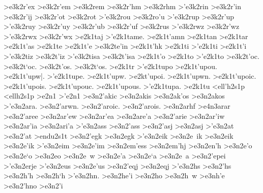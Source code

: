 {	>e3k2r'ex 
	>e3k2r'em		%
	>e3k2rem
	>e3k2r'hm		%
	>e3k2rhm
	>'e3k2rin		%
	>e3k2r'in
	>e3k2r'ij
	>e3k2r'ot		%
	>e3k2rot
	>'e3k2rou		%
	>e3k2ro'u
	>'e3k2rup  		%
	>e3k2r'up 		%
	>'e3k2ruy
	>e3k2r'uy
	>e3k2r'ub
	>e3k2r'uf
	>e3k2rus  		%
	>'e3k2rwz  		%
	>e3k2r'wz
	>'e3k2rwx  		%
	>e3k2r'wx
>e2k1taj  		%
>'e2k1tame. 		%
>e2k1t'amn  		%
>e2k1tan    		%
>e2k1tar   		%
>e2k1t'as   		%
>e2k1te
>e2k1t'e
	>e3k2te'in		%
>e2k1t'hk   		%
>e2k1ti
>'e2k1ti
>e2k1t'i
	>'e3k2tiz		%
	>e3k2t'iz
	>'e3k2tisa		%
	>e3k2t'isa
>e2k1t'o
>e2k1to
>'e2k1to
	>e3k2t'oc.		%
	>e3k2t`oc.
	>e3k2t'os.
	>e3k2t`os.
>e2k1tr
>'e2k1tupo  		%
>e2k1t'upou.
>e2k1t'upw|.
>'e2k1tupe.
>e2k1t'upw.
>e2kt'upoi.
>e2k1t'upwn.
>e2k1t'upoic.
>e2k1t'upois.
>e2k1t'upouc.
>e2k1t'upous.
>'e2k1tupa.
>e2k1tu
<ell'h2s1p 		%
<ellh2s1p
>e2n1
>'e2n1
	>e3n2'akic 		%
	>e3n2akis  		%
	>e3n2ak'os 		%
	>e3n2akos
	>'e3n2ara.   		%
	>e3n2'arwn.
	>e3n2'aroic.
	>e3n2'arois.
	>e3n2arhf   		%
		>e4n3arar 		%
	>e3n2'aree  		%
	>e3n2ar'ew
	>e3n2ar'ea  		%
	>e3n2are'a
	>e3n2'arie  		%
	>e3n2ar'iw
	>e3n2ar'ia  		%
	>e3n2ari'a
	>'e3n2ass  		%
	>e3n2'ass
	>e3n2'asj
	>e3n2asj
	>'e3n2at   		%
	>e3n2'at
>endu2s1t   		%
	>e3n2'egk   		%
	>e3n2egk    		%
	>'e3n2eik   		%
	>e3n2e~ik   		%
	>e3n2eik    		%
	>e3n2e'ik   		%
	>'e3n2eim   		%
	>e3n2e'im
	>e3n2em'ess 		%
	>e3n2em'hj  		%
	>e3n2en'h   		%
	>e3n2e'o    		%
	>e3n2e`o
	>e3n2eo
	>e3n2e~w
	>e3n2e'a
	>e3n2e`a
	>e3n2e~a 
	>e3n2'epei
	>'e3n2erje  		%
	>'e3n2eus   		%
	>e3n2e'us   		%
	>e3n2'eqj   		%
	>e3n2eqj
	>'e3n2hs		%
	>e3n2'hs
	>e3n2h'h		%
	>e3n2h`h
	>'e3n2hn.		%
	>e3n2he'i  		%
	>e3n2ho
	>e3n2h~w
	>e3nh'e
	>e3n2'hno   		%
	>e3n2'i
}
